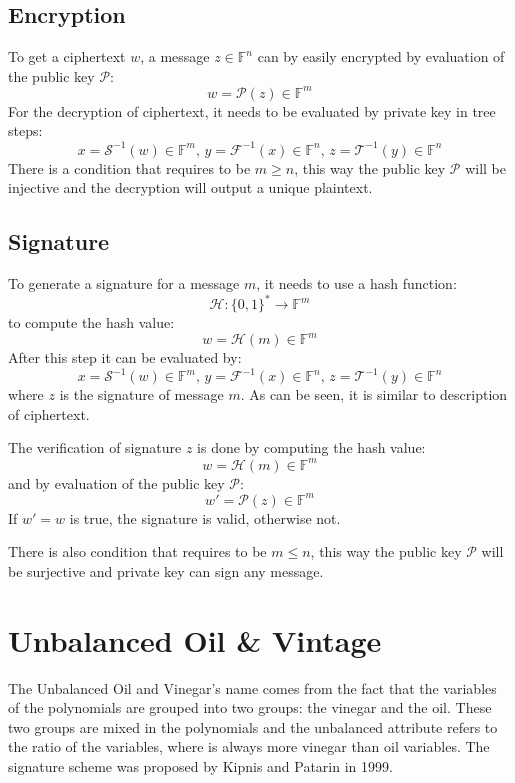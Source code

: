 \documentclass[thesis=M,english]{FITthesis}[2019/12/23]
\begin{document}
\subsection{Encryption}
To get a ciphertext $w$, a message $z \in \mathbb{F}^n$ can by easily encrypted by evaluation of the public key $\mathcal{P}$:
\[
	w = \mathcal{P}(z) \in \mathbb{F}^m
\]
For the decryption of ciphertext, it needs to be evaluated by private key in tree steps: 
\[
	x = \mathcal{S}^{-1}(w) \in \mathbb{F}^m, \, y = \mathcal{F}^{-1}(x) \in \mathbb{F}^n, \, z = \mathcal{T}^{-1}(y) \in \mathbb{F}^n
\]
There is a condition that requires to be $m \geq n$, this way the public key $\mathcal{P}$ will be injective and the decryption will output a unique plaintext.

\subsection{Signature}
To generate a signature for a message $m$, it needs to use a hash function:
\[
	\mathcal{H}: \{0,1\}^{*} \rightarrow \mathbb{F}^m
\]
to compute the hash value:
\[
	w = \mathcal{H}(m) \in \mathbb{F}^m
\]
After this step it can be evaluated by:
\[
	x = \mathcal{S}^{-1}(w) \in \mathbb{F}^m, \, y = \mathcal{F}^{-1}(x) \in \mathbb{F}^n, \, z = \mathcal{T}^{-1}(y) \in \mathbb{F}^n
\]
where $z$ is the signature of message $m$. As can be seen, it is similar to description of ciphertext.

The verification of signature $z$ is done by computing the hash value:
\[
	w = \mathcal{H}(m) \in \mathbb{F}^m
\]
and by evaluation of the public key $\mathcal{P}$:
\[
	w' = \mathcal{P}(z) \in \mathbb{F}^m
\]
If $w' = w$ is true, the signature is valid, otherwise not.

There is also condition that requires to be $m \leq n$, this way the public key $\mathcal{P}$ will be surjective and private key can sign any message.

\section{Unbalanced Oil \& Vintage}
The Unbalanced Oil and Vinegar's name comes from the fact that the variables of the polynomials are grouped into two groups: the vinegar and the oil. These two groups are mixed in the polynomials and the unbalanced attribute refers to the ratio of the variables, where is always more vinegar than oil variables. The signature scheme was proposed by Kipnis and Patarin in 1999.
\end{document}
